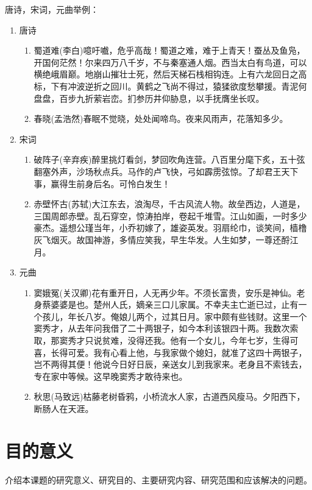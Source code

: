 唐诗，宋词，元曲举例：
\begin{enumerate}
	\item 唐诗
	\begin{enumerate} 
		\item 蜀道难(李白)噫吁嚱，危乎高哉！蜀道之难，难于上青天！蚕丛及鱼凫，开国何茫然！尔来四万八千岁，不与秦塞通人烟。西当太白有鸟道，可以横绝峨眉巅。地崩山摧壮士死，然后天梯石栈相钩连。上有六龙回日之高标，下有冲波逆折之回川。黄鹤之飞尚不得过，猿猱欲度愁攀援。青泥何盘盘，百步九折萦岩峦。扪参历井仰胁息，以手抚膺坐长叹。
		\item 春晓(孟浩然)春眠不觉晓，处处闻啼鸟。夜来风雨声，花落知多少。
	\end{enumerate}
	\item 宋词
	\begin{enumerate}
		\item 破阵子(辛弃疾)醉里挑灯看剑，梦回吹角连营。八百里分麾下炙，五十弦翻塞外声，沙场秋点兵。马作的卢飞快，弓如霹雳弦惊。了却君王天下事，赢得生前身后名。可怜白发生！
		\item 赤壁怀古(苏轼)大江东去，浪淘尽，千古风流人物。故垒西边，人道是，三国周郎赤壁。乱石穿空，惊涛拍岸，卷起千堆雪。江山如画，一时多少豪杰。遥想公瑾当年，小乔初嫁了，雄姿英发。羽扇纶巾，谈笑间，樯橹灰飞烟灭。故国神游，多情应笑我，早生华发。人生如梦，一尊还酹江月。
	\end{enumerate}
	\item 元曲
	\begin{enumerate}
		\item 窦娥冤(关汉卿)花有重开日，人无再少年。不须长富贵，安乐是神仙。老身蔡婆婆是也。楚州人氏，嫡亲三口儿家属。不幸夫主亡逝已过，止有一个孩儿，年长八岁。俺娘儿两个，过其日月。家中颇有些钱财。这里一个窦秀才，从去年问我借了二十两银子，如今本利该银四十两。我数次索取，那窦秀才只说贫难，没得还我。他有一个女儿，今年七岁，生得可喜，长得可爱。我有心看上他，与我家做个媳妇，就准了这四十两银子，岂不两得其便！他说今日好日辰，亲送女儿到我家来。老身且不索钱去，专在家中等候。这早晚窦秀才敢待来也。
		\item 秋思(马致远)枯藤老树昏鸦，小桥流水人家，古道西风瘦马。夕阳西下，断肠人在天涯。
	\end{enumerate}
\end{enumerate}

\section{目的意义}
介绍本课题的研究意义、研究目的、主要研究内容、研究范围和应该解决的问题。

